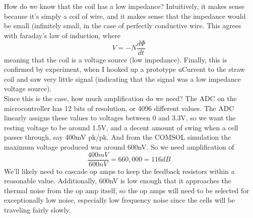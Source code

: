 \documentclass{article}
\begin{document}
\\ \\
How do we know that the coil has a low impedance? Intuitively, it makes sense
because it's simply a coil of wire, and it makes sense that the impedance would
be small (infinitely small, in the case of perfectly conductive wire. This
agrees with faraday's law of induction, where $$ V = -N \frac{d\Phi}{dt} $$
meaning that the coil is a voltage source (low impedance). Finally, this is
confirmed by experiment, when I hooked up a prototype uCurrent to the straw
coil and saw very little signal (indicating that the signal was a low impedance
voltage source). 
\\

Since this is the case, how much amplification do we need? The ADC on the
microcontroller has 12 bits of resolution, or 4096 different values. The ADC
linearly assigns these values to voltages between 0 and 3.3V, so we want the
resting voltage to be around 1.5V, and a decent amount of swing when a cell
passes through, say 400mV pk/pk. And from the COMSOL simulation the maximum
voltage produced was around 600nV. So we need amplification of
$$\frac{400mV}{600nV} = 660,000 = 116dB$$ We'll likely need to cascade op amps
to keep the feedback resistors within a reasonable value. Additionally, 600nV
is low enough that it approaches the thermal noise from the op amp itself, so
the op amps will need to be selected for exceptionally low noise, especially
low frequency noise since the cells will be traveling fairly slowly.
\end{document}
